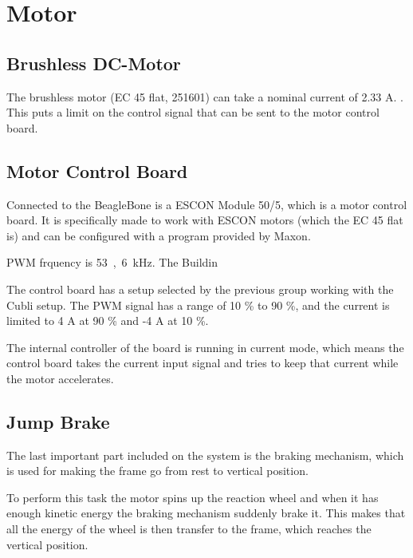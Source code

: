 \section{Motor}
\label{sec:Motor}


\subsection{Brushless DC-Motor}
The brushless motor (EC 45 flat, 251601) can take a nominal current of 2.33 A.\cite{MaxonMotors} . This puts a limit on the control signal that can be sent to the motor control board. 



\subsection{Motor Control Board}
Connected to the BeagleBone is a ESCON Module 50/5, which is a motor control board. It is specifically made to work with ESCON motors (which the EC 45 flat is) and can be configured with a program provided by Maxon.

PWM frquency is \si{53,6 kHz}.
The Buildin 

The control board has a setup selected by the previous group working with the Cubli setup. The PWM signal has a range of 10 \% to 90 \%, and the current is limited to 4 A at 90 \% and -4 A at 10 \%. 

The internal controller of the board is running in current mode, which means the control board takes the current input signal and tries to keep that current while the motor accelerates.

\subsection{Jump Brake}
The last important part included on the system is the braking mechanism, which is used for making the frame go from rest to vertical position. 

To perform this task the motor spins up the reaction wheel and when it has enough kinetic energy the braking mechanism suddenly brake it. This makes that all the energy of the wheel is then transfer to the frame, which reaches the vertical position.
